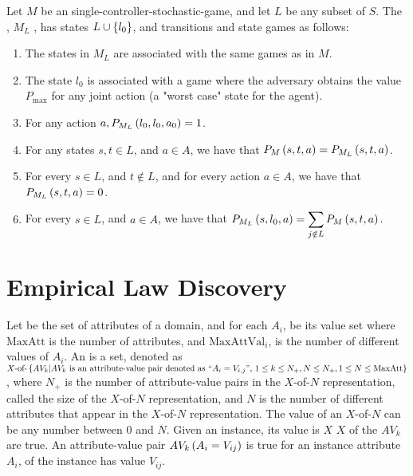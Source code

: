 \begin{defi}
Let $M$ be an single-controller-stochastic-game, and let $L$ be any subset of $S$. The , $M_L$ , has states $L\cup\left\{ l_0\right\}$, and transitions and state games as follows:
\begin{enumerate}
 \item The states in $M_L$ are associated with the same games as in $M$.
 \item The state $l_0$ is associated with a game where the adversary obtains the value $P_{\mbox{max}}$ for any joint action (a "worst case" state for the agent).
 \item For any action $a,P_{M_L}\left(l_0,l_0,a_0\right)=1$.
 \item For any states $s,t\in L$, and $a\in A$, we have that $P_M\left(s,t,a\right)=P_{M_L}\left(s,t,a\right)$.
 \item For every $s\in L$, and $t\notin L$, and for every action $a\in A$, we have that $P_{M_L}\left(s,t,a\right)=0$.
 \item For every $s\in L$, and $a\in A$, we have that $P_{M_L}\left(s,l_0,a\right)=\displaystyle\sum_{j\notin L}{P_M\left(s,t,a\right)}$.
\end{enumerate}
\cite{Brafman:1999:NPA:1624312.1624324}
\end{defi}


\section{Empirical Law Discovery}

\begin{defi}[$X$-of-$N$ representation]
Let  be the set of attributes of a domain, and for each $A_i$,  be its value set where $\mbox{MaxAtt}$ is the number of attributes, and $\mbox{MaxAttVal}_i$, is the number of different values of $A_i$. An  is a set, denoted as $\mbox{$X$-of-}\left\{ AV_k|AV_k\mbox{ is an attribute-value pair denoted as ``}A_i=V_{i,j}\mbox{'', }1\leq k\leq N_+, N\leq N_+, 1\leq N\leq\mbox{MaxAtt}\right\}$, where $N_+$ is the number of attribute-value pairs in the $X$-of-$N$ representation, called the size of the $X$-of-$N$ representation, and $N$ is the number of different attributes that appear in the $X$-of-$N$ representation. The value of an $X$-of-$N$ can be any number between $0$ and $N$. Given an instance, its value is $X$ \iffTx{} $X$ of the $AV_k$ are true. An attribute-value pair $AV_k\left(A_i=V_{ij}\right)$ is true for an instance \iffTx{} attribute $A_i$, of the instance has value $V_{ij}$.
\cite{conf/ijcai/Zheng95}
\end{defi}